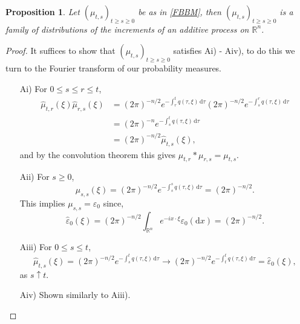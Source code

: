 \documentclass[a4paper, 12pt]{report}
\theoremstyle{cor}
\newtheorem{prop}[theorem]{Proposition}
\theoremstyle{remark}
\theoremstyle{definition}
\begin{document}
\begin{prop}
Let $(\mu_{t, s})_{t \ge s \ge 0}$ be as in \eqref{FBBM}, then $(\mu_{t, s})_{t \ge s \ge 0}$ is a family of distributions of the increments of an additive process on $\mathbb{R}^n$.
\end{prop}
\begin{proof}
It suffices to show that $(\mu_{t, s})_{t \ge s \ge 0}$ satisfies Ai) - Aiv), to do this we turn to the Fourier transform of our probability measures.
\begin{itemize}

\item[Ai)] For $0 \le s \le r \le t$,
\begin{align}
\hat{\mu}_{t, r}(\xi)\hat{\mu}_{r, s}(\xi) & = (2\pi)^{-n/2}e^{-\int_r^tq(\tau, \xi)\,\mathrm{d}\tau}(2\pi)^{-n/2}e^{-\int_s^rq(\tau, \xi)\,\mathrm{d}\tau}\nonumber\\
& = (2\pi)^{-n}e^{-\int_s^tq(\tau, \xi)\,\mathrm{d}\tau}\nonumber\\
& = (2\pi)^{-n/2}\hat{\mu}_{t, s}(\xi)\nonumber,
\end{align}
and by the convolution theorem this gives $\mu_{t, r}\ast\mu_{r, s} = \mu_{t, s}$.

\item[Aii)] For $s \ge 0$,
$$
\hat{\mu}_{s, s}(\xi) = (2\pi)^{-n/2}e^{-\int_s^sq(\tau, \xi)\,\mathrm{d}\tau} = (2\pi)^{-n/2}.
$$
This implies $\mu_{s, s} = \varepsilon_0$ since,
$$
\hat{\varepsilon}_0(\xi) = (2\pi)^{-n/2}\int_{\mathbb{R}^n}e^{-ix\cdot\xi}\varepsilon_0(\mathrm{d}x) = (2\pi)^{-n/2}.
$$

\item[Aiii)] For $0 \le s \le t$,
$$
\hat{\mu}_{t, s}(\xi) = (2\pi)^{-n/2}e^{-\int_s^tq(\tau, \xi)\,\mathrm{d}\tau} \to (2\pi)^{-n/2}e^{-\int_t^tq(\tau, \xi)\,\mathrm{d}\tau} = \hat{\varepsilon}_0(\xi),
$$
as $s \uparrow t$.

\item[Aiv)] Shown similarly to Aiii).

\end{itemize}
\end{proof}
\end{document}
